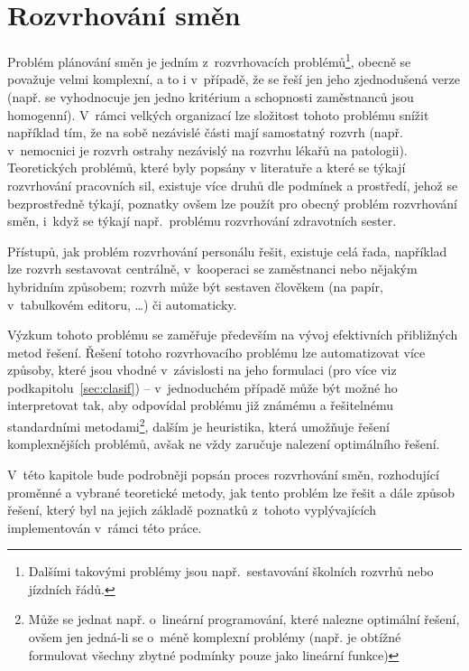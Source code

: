 \documentclass[twoside]{ctuthesis}
\begin{document}
\chapter{Rozvrhování směn}
Problém plánování směn je jedním z~rozvrhovacích problémů\footnote{Dalšími takovými problémy jsou např.~sestavování školních rozvrhů nebo jízdních řádů.}, obecně se považuje velmi komplexní, a to i v~případě, že se řeší jen jeho zjednodušená verze (např. se vyhodnocuje jen jedno kritérium a schopnosti zaměstnanců jsou homogenní). V~rámci velkých organizací lze složitost tohoto problému snížit například tím, že na sobě nezávislé části mají samostatný rozvrh (např. v~nemocnici je rozvrh ostrahy nezávislý na rozvrhu lékařů na patologii). Teoretických problémů, které byly popsány v literatuře a které se týkají rozvrhování pracovních sil, existuje více druhů dle podmínek a prostředí, jehož se bezprostředně týkají, poznatky ovšem lze použít pro obecný problém rozvrhování směn, i~když se týkají např.~problému rozvrhování zdravotních sester.

Přístupů, jak problém rozvrhování personálu řešit, existuje celá řada, například lze rozvrh sestavovat centrálně, v~kooperaci se zaměstnanci nebo nějakým hybridním způsobem; rozvrh může být sestaven člověkem (na papír, v~tabulkovém editoru, \ldots) či automaticky.

Výzkum tohoto problému se zaměřuje především na vývoj efektivních přibližných metod řešení. \cite{adamuthe2012tabu} Řešení totoho rozvrhovacího problému lze automatizovat více způsoby, které jsou vhodné v~závislosti na jeho formulaci (pro více viz podkapitolu~\ref{sec:clasif}) -- v~jednoduchém případě může být možné ho interpretovat tak, aby odpovídal problému již známému a řešitelnému standardními metodami\footnote{Může se jednat např. o~lineární programování, které nalezne optimální řešení, ovšem jen jedná-li se o~méně komplexní problémy (např. je obtížné formulovat všechny zbytné podmínky pouze jako lineární funkce)}, dalším je heuristika, která umožňuje řešení komplexnějších problémů, avšak ne vždy zaručuje nalezení optimálního řešení. \cite{blochliger2004modeling}

V~této kapitole bude podrobněji popsán proces rozvrhování směn, rozhodující proměnné a vybrané teoretické metody, jak tento problém lze řešit a dále způsob řešení, který byl na jejich základě poznatků z~tohoto vyplývajících implementován v~rámci této práce.
\end{document}
